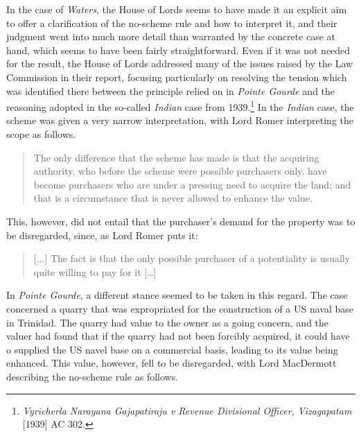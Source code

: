 In the case of \emph{Waters}, the House of Lords seems to have made it an explicit aim to offer a clarification of the no-scheme rule and how to interpret it, and their judgment went into much more detail than warranted by the concrete case at hand, which seems to have been fairly straightforward. Even if it was not needed for the result, the House of Lords addressed many of the issues raised by the Law Commission in their report, focusing particularly on resolving the tension which was identified there between the principle relied on in \emph{Pointe Gourde} and the reasoning adopted in the so-called \emph{Indian} case from 1939.\footnote{\emph{Vyricherla Narayana Gajapatiraju v Revenue Divisional
Officer, Vizagapatam} [1939] AC 302.} In the \emph{Indian} case, the scheme was given a very narrow interpretation, with Lord Romer interpreting the scope as follows.
\begin{quote}
The only difference that the scheme has made is that the acquiring
authority, who before the scheme were possible purchasers only, have
become purchasers who are under a pressing need to acquire the
land; and that is a circumstance that is never allowed to enhance the
value.
\end{quote}
This, however, did not entail that the purchaser's demand for the property was to be disregarded, since, as Lord Romer puts it:

\begin{quote}
[...] The fact is that the only possible purchaser of a potentiality is
usually quite willing to pay for it […]
\end{quote}

In \emph{Pointe Gourde}, a different stance seemed to be taken in this regard. The case concerned a quarry that was expropriated for the construction of a US naval base in Trinidad. The quarry had value to the owner as a going concern, and the valuer had found that if the quarry had not been forcibly acquired, it could have o supplied the US navel base on a commercial basis, leading to its value being enhanced. This value, however, fell to be disregarded, with Lord MacDermott describing the no-scheme rule as follows.

